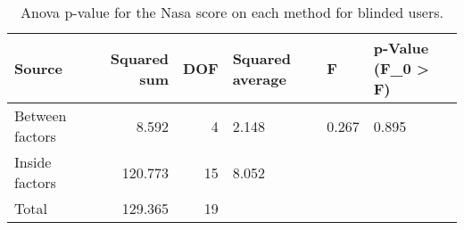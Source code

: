 
\begin{table}[!htb]
\centering
\caption{Anova p-value for the Nasa score on each method for blinded users.}
\label{tab:anova_nasa}
\begin{tabular}{lrrlll}
\toprule
         Source &  Squared sum &  DOF & Squared average &     F & p-Value (F\_0 > F) \\
\midrule
Between factors &        8.592 &    4 &           2.148 & 0.267 &             0.895 \\
 Inside factors &      120.773 &   15 &           8.052 &       &                   \\
          Total &      129.365 &   19 &                 &       &                   \\
\bottomrule
\end{tabular}
\end{table}

